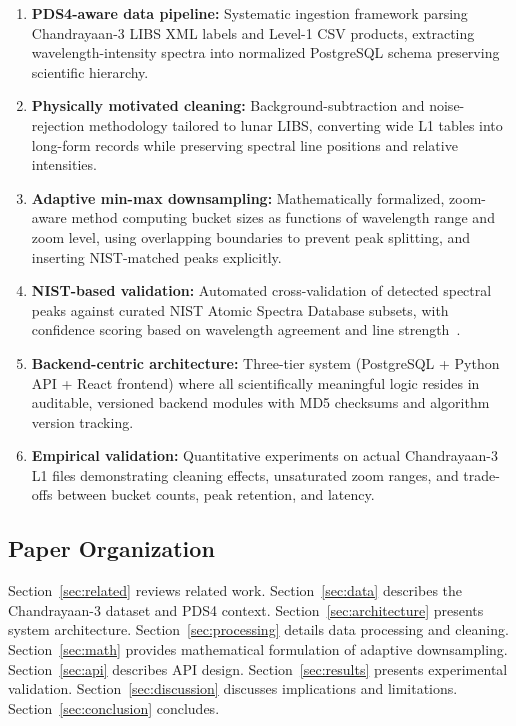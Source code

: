 \documentclass[11pt,a4paper]{article}
\begin{document}
\begin{enumerate}[label=\textbf{C\arabic*.},leftmargin=1.5em]
\setlength{\itemsep}{2pt}
\item \textbf{PDS4-aware data pipeline:} Systematic ingestion framework parsing Chandrayaan-3 LIBS XML labels and Level-1 CSV products, extracting wavelength-intensity spectra into normalized PostgreSQL schema preserving scientific hierarchy.

\item \textbf{Physically motivated cleaning:} Background-subtraction and noise-rejection methodology tailored to lunar LIBS, converting wide L1 tables into long-form records while preserving spectral line positions and relative intensities.

\item \textbf{Adaptive min-max downsampling:} Mathematically formalized, zoom-aware method computing bucket sizes as functions of wavelength range and zoom level, using overlapping boundaries to prevent peak splitting, and inserting NIST-matched peaks explicitly.

\item \textbf{NIST-based validation:} Automated cross-validation of detected spectral peaks against curated NIST Atomic Spectra Database subsets, with confidence scoring based on wavelength agreement and line strength~\cite{Reader2011}.

\item \textbf{Backend-centric architecture:} Three-tier system (PostgreSQL + Python API + React frontend) where all scientifically meaningful logic resides in auditable, versioned backend modules with MD5 checksums and algorithm version tracking.

\item \textbf{Empirical validation:} Quantitative experiments on actual Chandrayaan-3 L1 files demonstrating cleaning effects, unsaturated zoom ranges, and trade-offs between bucket counts, peak retention, and latency.
\end{enumerate}

\subsection{Paper Organization}

Section~\ref{sec:related} reviews related work. Section~\ref{sec:data} describes the Chandrayaan-3 dataset and PDS4 context. Section~\ref{sec:architecture} presents system architecture. Section~\ref{sec:processing} details data processing and cleaning. Section~\ref{sec:math} provides mathematical formulation of adaptive downsampling. Section~\ref{sec:api} describes API design. Section~\ref{sec:results} presents experimental validation. Section~\ref{sec:discussion} discusses implications and limitations. Section~\ref{sec:conclusion} concludes.
\end{document}
